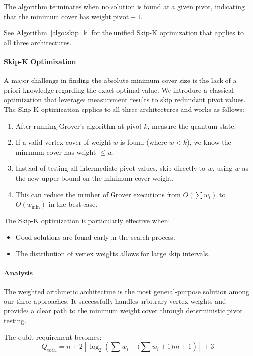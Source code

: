 \documentclass{ieeeaccess}
\begin{document}
The algorithm terminates when no solution is found at a
given pivot, indicating that the minimum cover has weight
$\mathrm{pivot} - 1$.

See Algorithm~\ref{algo:skip_k} for the unified Skip-K
optimization that applies to all three architectures.

\paragraph{Skip-K Optimization}
\label{para:skip-k}
A major challenge in finding the absolute minimum cover size
is the lack of a priori knowledge regarding the exact optimal
value. We introduce a classical optimization that leverages
measurement results to skip redundant pivot values. The
Skip-K optimization applies to all three architectures and
works as follows:

\begin{enumerate}
    \item After running Grover's algorithm at pivot $k$,
    measure the quantum state.
    \item If a valid vertex cover of weight $w$ is found
    (where $w < k$), we know the minimum cover has weight
    $\leq w$.
    \item Instead of testing all intermediate pivot values,
    skip directly to $w$, using $w$ as the new upper bound
    on the minimum cover weight.
    \item This can reduce the number of Grover executions
    from $O(\sum w_i)$ to $O(w_{\min})$ in the best case.
\end{enumerate}

The Skip-K optimization is particularly effective when:
\begin{itemize}
    \item Good solutions are found early in the search
    process.
    \item The distribution of vertex weights allows for large
    skip intervals.
\end{itemize}

\paragraph{Analysis}
The weighted arithmetic architecture is the most
general-purpose solution among our three approaches. It
successfully handles arbitrary vertex weights and provides a
clear path to the minimum weight cover through deterministic
pivot testing.

The qubit requirement becomes:
\begin{equation}
    Q_{\mathrm{total}}
    = n + 2\,\left\lceil\log_2\!\left(
        \textstyle\sum w_i
        + \bigl(\textstyle\sum w_i + 1\bigr)m + 1
      \right)\right\rceil + 3
    \label{eq:weighted-qubits}
\end{equation}
\end{document}
